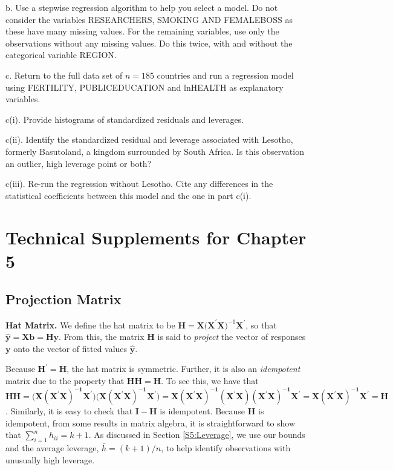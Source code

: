 \begin{exercises}
b. Use a stepwise regression algorithm to help you select a model.
Do not consider the variables RESEARCHERS, SMOKING AND FEMALEBOSS as
these have many missing values. For the remaining variables, use
only the observations without any missing values. Do this twice,
with and without the categorical variable REGION.

c. Return to the full data set of $n=185$ countries and run a
regression model using FERTILITY, PUBLICEDUCATION and lnHEALTH as
explanatory variables.

c(i). Provide histograms of standardized residuals and leverages.

c(ii). Identify the standardized residual and leverage associated
with Lesotho, formerly Basutoland, a kingdom surrounded by South
Africa. Is this observation an outlier, high leverage point or both?

c(iii). Re-run the regression without Lesotho. Cite any differences
in the statistical coefficients between this model and the one in
part c(i).



\end{exercises}



\bigskip

\bigskip
\setcounter{equation}{13}
\section{Technical Supplements for Chapter 5}\label{S5:TechSupps}

\subsection{Projection Matrix}\label{S5:ProjMatrix}

\textbf{Hat Matrix.} We define the hat matrix to be $\mathbf{H} =
\mathbf{X(X}^{\prime}\mathbf{X)}^{-1} \mathbf{X}^{\prime}$, so that
$\mathbf{\hat{y}} = \mathbf{X b} =\mathbf{Hy}$. From this, the
matrix $\mathbf{H}$ is said to \textit{project} the vector of
responses $ \mathbf{y}$ onto the vector of fitted values
$\mathbf{\hat{y}}$.


Because $\mathbf{H}^{\prime}=\mathbf{H}$, the hat matrix is
symmetric. Further, it is also an \textit{idempotent} matrix due to
the property that $\mathbf{HH}=\mathbf{H}$. To see this, we have
that
$\mathbf{HH}=\mathbf{(X(\mathbf{X}^{\prime}X)}^{\mathbf{-1}}\mathbf{X}^{\prime}\mathbf{)(X(\mathbf{
X}^{\prime}X)}^{\mathbf{-1}}\mathbf{X}^{\prime}\mathbf{)}=\mathbf{X(
\mathbf{X}^{\prime}X)}^{\mathbf{-1}}\mathbf{(\mathbf{X}^{\prime}X)(\mathbf{X}^{\prime}X)}^{\mathbf{-1}}
\mathbf{X}^{\prime}=\mathbf{X(\mathbf{X}
^{\prime}X)}^{\mathbf{-1}}\mathbf{X}^{\prime}=\mathbf{H}$.
Similarly, it is easy to check that $\mathbf{I-H}$ is idempotent.
Because \textbf{H} is idempotent, from some results in matrix
algebra, it is straightforward to show that
$\sum_{i=1}^{n}h_{ii}=k+1$. As discussed in Section
\ref{S5:Leverage}, we use our bounds and the average leverage,
$\bar{h}=(k+1)/n$, to help identify observations with unusually high
leverage.

